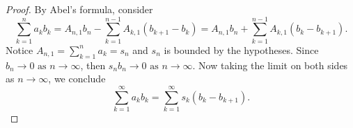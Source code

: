 \begin{Exercise}
\begin{proof}
By Abel's formula, consider $$\sum_{k=1}^{n}a_k b_k = 
A_{n,1}b_n - \sum_{k=1}^{n-1}A_{k,1}(b_{k+1}-b_k) = A_{n,1}b_n + \sum_{k=1}^{n-1}A_{k,1}(b_k-b_{k+1}).$$ Notice $A_{n,1} = \sum_{k=1}^{n}a_k = s_n$ and $s_n$ is bounded by the hypotheses. Since $b_n\to 0\text{ as } n\to\infty$, then $s_n b_n\to 0\text{ as } n\to\infty$. Now taking the limit on both sides as $n\to\infty$, we conclude  $$\sum_{k=1}^{\infty}a_k b_k = \sum_{k=1}^{\infty}s_k (b_k - b_{k+1}).$$
\end{proof}
\end{Exercise}